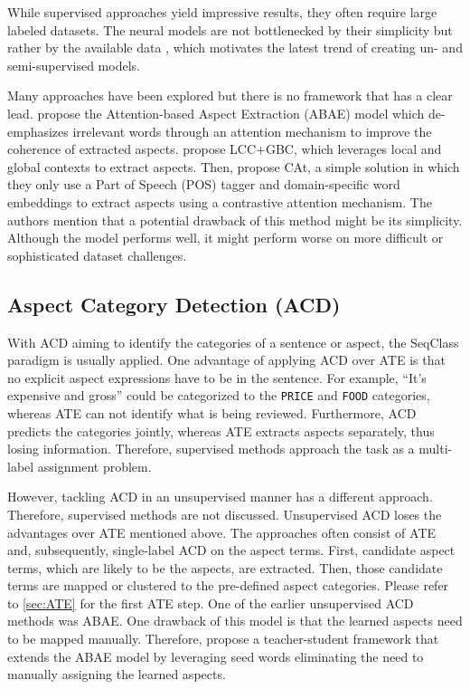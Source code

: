 \documentclass[american, oneside]{ecsgdp}
\begin{document}

While supervised approaches yield impressive results, they often require large labeled datasets. The neural models are not bottlenecked by their simplicity but rather by the available data \parencite{Huang2020JASen}, which motivates the latest trend of creating un- and semi-supervised models.  


Many approaches have been explored but there is no framework that has a clear lead. \textcite{He2017ABAE} propose the Attention-based Aspect Extraction (ABAE) model which de-emphasizes irrelevant words through an attention mechanism to improve the coherence of extracted aspects. \textcite{Liao2019LCC+GBC} propose LCC+GBC, which leverages local and global contexts to extract aspects. Then, \textcite{Tulkens2020CAt} propose CAt, a simple solution in which they only use a Part of Speech (POS) tagger and domain-specific word embeddings to extract aspects using a contrastive attention mechanism. The authors mention that a potential drawback of this method might be its simplicity. Although the model performs well, it might perform worse on more difficult or sophisticated dataset challenges. 


\subsection{Aspect Category Detection (ACD)} \label{sec:ACD}
With ACD aiming to identify the categories of a sentence or aspect, the SeqClass paradigm is usually applied. One advantage of applying ACD over ATE is that no explicit aspect expressions have to be in the sentence. For example, ``It's expensive and gross'' could be categorized to the \texttt{PRICE} and \texttt{FOOD} categories, whereas ATE can not identify what is being reviewed. Furthermore, ACD predicts the categories jointly, whereas ATE extracts aspects separately, thus losing information. Therefore, supervised methods approach the task as a multi-label assignment problem. 

However, tackling ACD in an unsupervised manner has a different approach. Therefore, supervised methods are not discussed. Unsupervised ACD loses the advantages over ATE mentioned above. The approaches often consist of ATE and, subsequently, single-label ACD on the aspect terms. First, candidate aspect terms, which are likely to be the aspects, are extracted. Then, those candidate terms are mapped or clustered to the pre-defined aspect categories. Please refer to \cref{sec:ATE} for the first ATE step. One of the earlier unsupervised ACD methods was ABAE. One drawback of this model is that the learned aspects need to be mapped manually. Therefore, \textcite{Karamanolakis2019Seed} propose a teacher-student framework that extends the ABAE model by leveraging seed words eliminating the need to manually assigning the learned aspects. %
\end{document}
